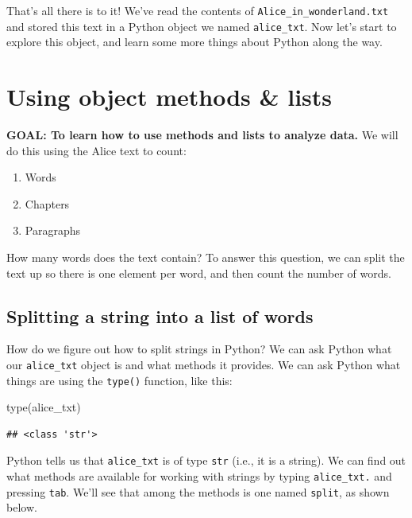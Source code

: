 \documentclass[
]{book}
\newenvironment{Shaded}{\begin{snugshade}}{\end{snugshade}}
\newcommand{\BuiltInTok}[1]{#1}
\newcommand{\NormalTok}[1]{#1}
\providecommand{\tightlist}{%
  \setlength{\itemsep}{0pt}\setlength{\parskip}{0pt}}
\begin{document}
That's all there is to it! We've read the contents of \texttt{Alice\_in\_wonderland.txt} and stored this text in a Python object we named \texttt{alice\_txt}. Now let's start to explore this object, and learn some more things about Python along the way.

\hypertarget{using-object-methods-lists}{%
\section{Using object methods \& lists}\label{using-object-methods-lists}}

\textbf{GOAL: To learn how to use methods and lists to analyze data.} We will do this using the Alice text to count:

\begin{enumerate}
\def\labelenumi{\arabic{enumi}.}
\tightlist
\item
  Words
\item
  Chapters
\item
  Paragraphs
\end{enumerate}

How many words does the text contain? To answer this question, we can split the text up so there is one element per word, and then count the number of words.

\hypertarget{splitting-a-string-into-a-list-of-words}{%
\subsection{Splitting a string into a list of words}\label{splitting-a-string-into-a-list-of-words}}

How do we figure out how to split strings in Python? We can ask Python what our \texttt{alice\_txt} object is and what methods it provides. We can ask Python what things are using the \texttt{type()} function, like this:

\begin{Shaded}
\begin{Highlighting}[]
\BuiltInTok{type}\NormalTok{(alice\_txt)}
\end{Highlighting}
\end{Shaded}

\begin{verbatim}
## <class 'str'>
\end{verbatim}

Python tells us that \texttt{alice\_txt} is of type \texttt{str} (i.e., it is a string). We can find out what methods are available for working with strings by typing \texttt{alice\_txt.} and pressing \texttt{tab}. We'll see that among the methods is one named \texttt{split}, as shown below.
\end{document}
